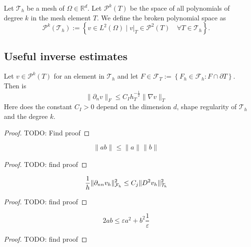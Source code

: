 \begin{definition}
    Let $\mathcal{T}_{h} $ be a mesh of $\Omega \in \mathbb{R} ^{d} $. Let $\mathcal{P}^{k}(T) $ be the space of all polynomials of degree $k$ in the mesh element $T$. We define the broken polynomial space as \[
    \mathcal{P}^{k} ( \mathcal{T}_{h} ) := \left\{ v \in L^2( \Omega )  \mid  v|_{T} \in \mathcal{P}^2( T) \quad  \forall T \in  \mathcal{T}_{h}   \right\}.
    \]
\end{definition}

\subsection{Useful inverse estimates}%
\label{sub:useful_inverse_estimates}


\begin{lemma}
    \label{lemma:local_inverse_estimates}
    Let $v \in \mathcal{P}^{k} ( T)  $ for an element in $\mathcal{T}_{h} $ and let $F \in \mathcal{F}_{T} := \left\{ F_{h} \in \mathcal{F} _{h} : F \cap \partial T \right\}  $. Then is \[
    \| \partial _{n} v \|_{ F   }^{  } \le  C_{I} h_{T}^{-\frac{1}{2}} \| \nabla v \|_{  T}^{  }
    \]
    Here does the constant $C_{I}>0$ depend on the dimension $d$, shape regularity of $\mathcal{T}_{h} $ and the degree $k$.
\end{lemma}

\begin{proof}
    TODO: Find proof
\end{proof}

\begin{lemma}
    \label{lemma:cauchy-schwarz}
    \[
     \| ab \|_{  }^{  }  \le \| a \|_{  }^{  } \| b \|_{  }^{  }
    \]
\end{lemma}
\begin{proof}
    TODO: find proof
\end{proof}

\begin{lemma}
    \[
     \frac{1}{h}\| \partial _{nn}  v_{h} \|_{\mathcal{F}_{h}   }^{2  }  \le C_{j} \| D ^2 v_{h} \|_{ \mathcal{T} _{h} }^{ 2 }   \\
    \]

\end{lemma}
\begin{proof}
    TODO: find proof
\end{proof}
\begin{lemma}
    \label{lemma:youngs_epsilon}
   \[
     2ab \le \varepsilon a^2+ b^2 \frac{1}{\varepsilon }
   \]
\end{lemma}
\begin{proof}
    TODO: find proof
\end{proof}



